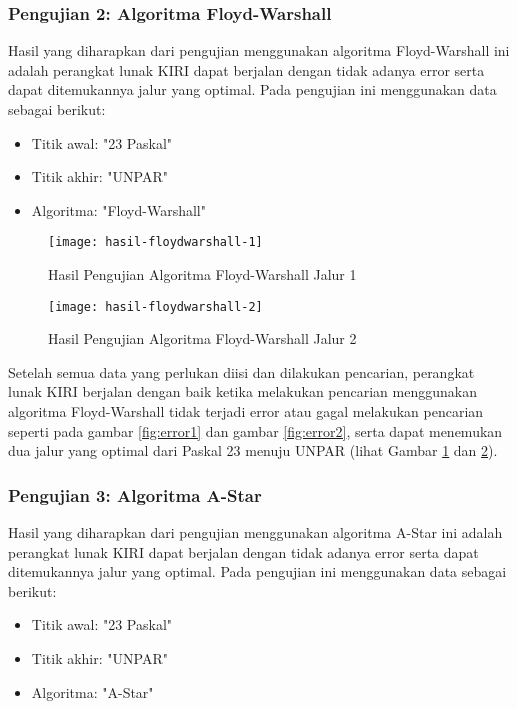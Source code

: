 \subsubsection{Pengujian 2: Algoritma Floyd-Warshall}
Hasil yang diharapkan dari pengujian menggunakan algoritma Floyd-Warshall ini adalah perangkat lunak KIRI dapat berjalan dengan tidak adanya error serta dapat ditemukannya jalur yang optimal. Pada pengujian ini menggunakan data sebagai berikut:
\begin{itemize}
    \item Titik awal: "23 Paskal"
    \item Titik akhir: "UNPAR"
    \item Algoritma: "Floyd-Warshall"
\end{itemize}

\begin{figure}[H]
    \centering
    \texttt{[image: hasil-floydwarshall-1]}
    \caption{Hasil Pengujian Algoritma Floyd-Warshall Jalur 1}
    \label{fig:hasilfloydwarshall-1}
\end{figure}

\begin{figure}[H]
    \centering
    \texttt{[image: hasil-floydwarshall-2]}
    \caption{Hasil Pengujian Algoritma Floyd-Warshall Jalur 2}
    \label{fig:hasilfloydwarshall-2}
\end{figure}

\noindent
Setelah semua data yang perlukan diisi dan dilakukan pencarian, perangkat lunak KIRI berjalan dengan baik ketika melakukan pencarian menggunakan algoritma Floyd-Warshall tidak terjadi error atau gagal melakukan pencarian seperti pada gambar \ref{fig:error1} dan gambar \ref{fig:error2}, serta dapat menemukan dua jalur yang optimal dari Paskal 23 menuju UNPAR (lihat Gambar \ref{fig:hasilfloydwarshall-1} dan \ref{fig:hasilfloydwarshall-2}).

\subsubsection{Pengujian 3: Algoritma A-Star}
Hasil yang diharapkan dari pengujian menggunakan algoritma A-Star ini adalah perangkat lunak KIRI dapat berjalan dengan tidak adanya error serta dapat ditemukannya jalur yang optimal. Pada pengujian ini menggunakan data sebagai berikut:
\begin{itemize}
    \item Titik awal: "23 Paskal"
    \item Titik akhir: "UNPAR"
    \item Algoritma: "A-Star"
\end{itemize}

